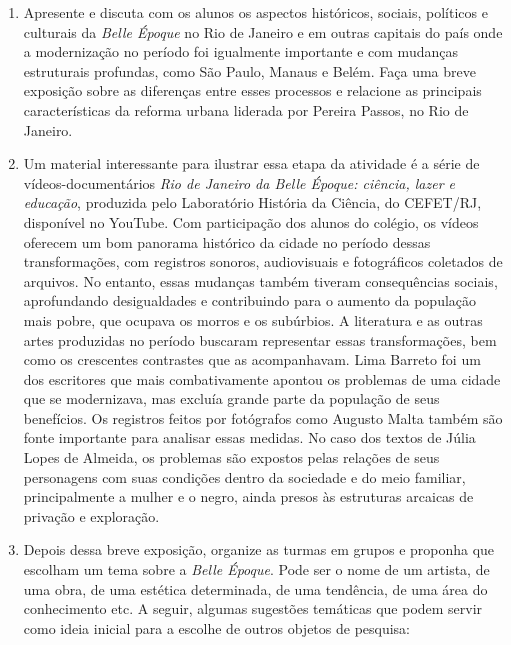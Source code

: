 \documentclass[12pt]{extarticle}
\begin{document}
\begin{enumerate}

\item
Apresente e discuta com os alunos os aspectos
históricos, sociais, políticos e culturais da \emph{Belle Époque} no Rio
de Janeiro e em outras capitais do país onde a modernização no período
foi igualmente importante e com mudanças estruturais profundas, como São
Paulo, Manaus e Belém. Faça uma breve exposição sobre as diferenças
entre esses processos e relacione as principais características da
reforma urbana liderada por Pereira Passos, no Rio de Janeiro.

\item
Um material interessante para ilustrar essa etapa da atividade é a
série de vídeos-documentários \emph{Rio de Janeiro da Belle Époque:
ciência, lazer e educação}, produzida pelo Laboratório História da
Ciência, do CEFET/RJ, disponível no YouTube. Com participação dos
alunos do colégio, os vídeos oferecem um bom panorama histórico da
cidade no período dessas transformações, com registros sonoros,
audiovisuais e fotográficos coletados de arquivos.
No entanto, essas mudanças também tiveram consequências sociais,
aprofundando desigualdades e contribuindo para o aumento da população
mais pobre, que ocupava os morros e os subúrbios. A literatura e as
outras artes produzidas no período buscaram representar essas
transformações, bem como os crescentes contrastes que as
acompanhavam. Lima Barreto foi um dos escritores que mais combativamente
apontou os problemas de uma cidade que se modernizava, mas excluía
grande parte da população de seus benefícios. Os registros feitos por
fotógrafos como Augusto Malta também são fonte importante para analisar
essas medidas. No caso dos textos de Júlia Lopes de Almeida, os
problemas são expostos pelas relações de seus personagens com suas
condições dentro da sociedade e do meio familiar, principalmente a
mulher e o negro, ainda presos às estruturas arcaicas de privação e
exploração.

\item
Depois dessa breve exposição, organize as turmas em grupos e proponha
que escolham um tema sobre a \emph{Belle Époque}. Pode ser o nome de um
artista, de uma obra, de uma estética determinada, de uma tendência, de
uma área do conhecimento etc. A seguir, algumas sugestões temáticas que
podem servir como ideia inicial para a escolhe de outros
objetos de pesquisa:


\end{enumerate}
\end{document}
